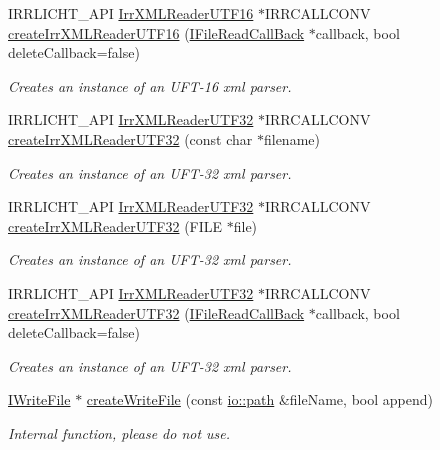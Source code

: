 \begin{DoxyCompactItemize}
I\+R\+R\+L\+I\+C\+H\+T\+\_\+\+A\+PI \hyperlink{namespaceirr_1_1io_a76b498bd6edceb2e2ef91d75585e6bfd}{Irr\+X\+M\+L\+Reader\+U\+T\+F16} $\ast$I\+R\+R\+C\+A\+L\+L\+C\+O\+NV \hyperlink{namespaceirr_1_1io_acb1ed419a0327adcf0da1a779d553efa}{create\+Irr\+X\+M\+L\+Reader\+U\+T\+F16} (\hyperlink{classirr_1_1io_1_1IFileReadCallBack}{I\+File\+Read\+Call\+Back} $\ast$callback, bool delete\+Callback=false)
\begin{DoxyCompactList}\small\item\em Creates an instance of an U\+F\+T-\/16 xml parser. \end{DoxyCompactList}\item 
I\+R\+R\+L\+I\+C\+H\+T\+\_\+\+A\+PI \hyperlink{namespaceirr_1_1io_aa596f324a302585d965b1a28c562561b}{Irr\+X\+M\+L\+Reader\+U\+T\+F32} $\ast$I\+R\+R\+C\+A\+L\+L\+C\+O\+NV \hyperlink{namespaceirr_1_1io_a69d4b7a461a7a0b8715d346bbe9a49b0}{create\+Irr\+X\+M\+L\+Reader\+U\+T\+F32} (const char $\ast$filename)
\begin{DoxyCompactList}\small\item\em Creates an instance of an U\+F\+T-\/32 xml parser. \end{DoxyCompactList}\item 
I\+R\+R\+L\+I\+C\+H\+T\+\_\+\+A\+PI \hyperlink{namespaceirr_1_1io_aa596f324a302585d965b1a28c562561b}{Irr\+X\+M\+L\+Reader\+U\+T\+F32} $\ast$I\+R\+R\+C\+A\+L\+L\+C\+O\+NV \hyperlink{namespaceirr_1_1io_a91353e14923adc422fdae4195eb67d05}{create\+Irr\+X\+M\+L\+Reader\+U\+T\+F32} (F\+I\+LE $\ast$file)
\begin{DoxyCompactList}\small\item\em Creates an instance of an U\+F\+T-\/32 xml parser. \end{DoxyCompactList}\item 
I\+R\+R\+L\+I\+C\+H\+T\+\_\+\+A\+PI \hyperlink{namespaceirr_1_1io_aa596f324a302585d965b1a28c562561b}{Irr\+X\+M\+L\+Reader\+U\+T\+F32} $\ast$I\+R\+R\+C\+A\+L\+L\+C\+O\+NV \hyperlink{namespaceirr_1_1io_af26624a677d2662df81b57e2b0fda6de}{create\+Irr\+X\+M\+L\+Reader\+U\+T\+F32} (\hyperlink{classirr_1_1io_1_1IFileReadCallBack}{I\+File\+Read\+Call\+Back} $\ast$callback, bool delete\+Callback=false)
\begin{DoxyCompactList}\small\item\em Creates an instance of an U\+F\+T-\/32 xml parser. \end{DoxyCompactList}\item 
\mbox{\label{namespaceirr_1_1io_a45f363eac6bd6f3d54712def26cfe7c5}} 
\hyperlink{classirr_1_1io_1_1IWriteFile}{I\+Write\+File} $\ast$ \hyperlink{namespaceirr_1_1io_a45f363eac6bd6f3d54712def26cfe7c5}{create\+Write\+File} (const \hyperlink{namespaceirr_1_1io_a6468281622ce3a1c46b72e19f32dded5}{io\+::path} \&file\+Name, bool append)
\begin{DoxyCompactList}\small\item\em Internal function, please do not use. \end{DoxyCompactList}\end{DoxyCompactItemize}



